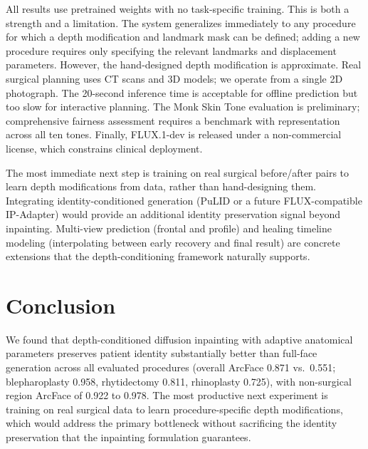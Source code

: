 \documentclass[runningheads]{llncs}
\begin{document}
All results use pretrained weights with no task-specific training. This
is both a strength and a limitation. The system generalizes immediately
to any procedure for which a depth modification and landmark mask can be
defined; adding a new procedure requires only specifying the relevant
landmarks and displacement parameters. However, the hand-designed depth
modification is approximate. Real surgical planning uses CT scans and 3D
models; we operate from a single 2D photograph. The 20-second inference
time is acceptable for offline prediction but too slow for interactive
planning. The Monk Skin Tone evaluation is preliminary; comprehensive
fairness assessment requires a benchmark with representation across all
ten tones. Finally, FLUX.1-dev is released under a non-commercial
license, which constrains clinical deployment.

The most immediate next step is training on real surgical before/after
pairs to learn depth modifications from data, rather than hand-designing
them. Integrating identity-conditioned generation (PuLID or a future
FLUX-compatible IP-Adapter) would provide an additional identity
preservation signal beyond inpainting. Multi-view prediction (frontal and
profile) and healing timeline modeling (interpolating between early
recovery and final result) are concrete extensions that the
depth-conditioning framework naturally supports.

\section{Conclusion}
\label{sec:conclusion}

We found that depth-conditioned diffusion inpainting with adaptive
anatomical parameters preserves patient identity substantially better
than full-face generation across all evaluated procedures (overall
ArcFace 0.871 vs.\ 0.551; blepharoplasty 0.958, rhytidectomy 0.811,
rhinoplasty 0.725), with non-surgical region ArcFace of 0.922 to 0.978. The most productive next
experiment is training on real surgical data to learn procedure-specific
depth modifications, which would address the primary bottleneck without
sacrificing the identity preservation that the inpainting formulation
guarantees.


\end{document}
